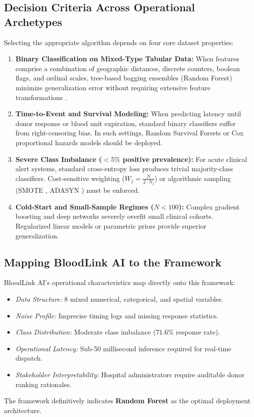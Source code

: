 \documentclass[conference]{IEEEtran}
\begin{document}
\subsection{Decision Criteria Across Operational Archetypes}
Selecting the appropriate algorithm depends on four core dataset properties:
\begin{enumerate}
    \item \textbf{Binary Classification on Mixed-Type Tabular Data:} When features comprise a combination of geographic distances, discrete counters, boolean flags, and ordinal scales, tree-based bagging ensembles (Random Forest) minimize generalization error without requiring extensive feature transformations \cite{breiman2001randomforest, grinsztajn2022tree}.
    \item \textbf{Time-to-Event and Survival Modeling:} When predicting latency until donor response or blood unit expiration, standard binary classifiers suffer from right-censoring bias. In such settings, Random Survival Forests \cite{ishwaran2010randomsurvival} or Cox proportional hazards models should be deployed.
    \item \textbf{Severe Class Imbalance ($<5\%$ positive prevalence):} For acute clinical alert systems, standard cross-entropy loss produces trivial majority-class classifiers. Cost-sensitive weighting ($W_j = \frac{N}{2 \cdot N_j}$) or algorithmic sampling (SMOTE \cite{chawla2002smote}, ADASYN \cite{he2009learning}) must be enforced.
    \item \textbf{Cold-Start and Small-Sample Regimes ($N < 100$):} Complex gradient boosting and deep networks severely overfit small clinical cohorts. Regularized linear models or parametric priors provide superior generalization.
\end{enumerate}

\subsection{Mapping BloodLink AI to the Framework}
BloodLink AI's operational characteristics map directly onto this framework:
\begin{itemize}
    \item \textit{Data Structure:} 8 mixed numerical, categorical, and spatial variables.
    \item \textit{Noise Profile:} Imprecise timing logs and missing response statistics.
    \item \textit{Class Distribution:} Moderate class imbalance ($71.6\%$ response rate).
    \item \textit{Operational Latency:} Sub-50 millisecond inference required for real-time dispatch.
    \item \textit{Stakeholder Interpretability:} Hospital administrators require auditable donor ranking rationales.
\end{itemize}
The framework definitively indicates \textbf{Random Forest} as the optimal deployment architecture.
\end{document}
